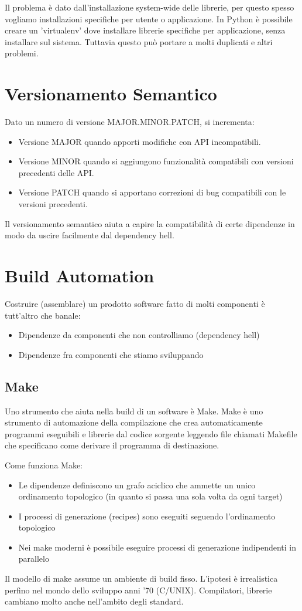 \documentclass[a4paper,12pt,titlepage,oneside]{book}
\begin{document}
Il problema è dato dall'installazione system-wide delle librerie, per questo spesso vogliamo installazioni specifiche per utente o applicazione.
In Python è possibile creare un 'virtualenv' dove installare librerie specifiche per applicazione, senza installare sul sistema. Tuttavia questo può portare a molti duplicati e altri problemi.

\chapter{Versionamento Semantico}
Dato un numero di versione MAJOR.MINOR.PATCH, si incrementa:
\begin{itemize}
    \item Versione MAJOR quando apporti modifiche con API incompatibili.
    \item Versione MINOR quando si aggiungono funzionalità compatibili con versioni precedenti delle API.
    \item Versione PATCH quando si apportano correzioni di bug compatibili con le versioni precedenti.
\end{itemize}
Il versionamento semantico aiuta a capire la compatibilità di certe dipendenze in modo da uscire facilmente dal dependency hell.

\chapter{Build Automation}
Costruire (assemblare) un prodotto software fatto di molti componenti è tutt'altro che banale:
\begin{itemize}
    \item Dipendenze da componenti che non controlliamo (dependency hell)
    \item Dipendenze fra componenti che stiamo sviluppando
\end{itemize}

\section{Make}
Uno strumento che aiuta nella build di un software è Make. Make è uno strumento di automazione della compilazione che crea automaticamente programmi eseguibili e librerie dal codice sorgente leggendo file chiamati 
Makefile che specificano come derivare il programma di destinazione.

Come funziona Make:
\begin{itemize}
    \item Le dipendenze definiscono un grafo aciclico che ammette un unico ordinamento topologico (in quanto si passa una sola volta da ogni target)
    \item I processi di generazione (recipes) sono eseguiti seguendo l’ordinamento topologico
    \item Nei make moderni è possibile eseguire processi di generazione indipendenti in parallelo
\end{itemize}
Il modello di make assume un ambiente di build fisso. L’ipotesi è irrealistica perfino nel mondo dello sviluppo anni ’70 (C/UNIX). Compilatori, librerie cambiano molto anche nell’ambito degli standard.
\end{document}
